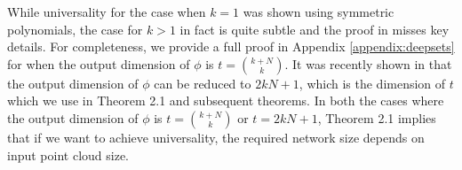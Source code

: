 \documentclass[12pt]{article}
\newcommand{\samedit}[1]{{{\textcolor{darkblue}{#1}}}}
\begin{document}
While universality for the case when $k = 1$ was shown using symmetric polynomials, the case for $k > 1$ in fact is quite subtle and the proof in \citep{zaheer2017deep} misses key details. For completeness, we provide a full proof in Appendix \ref{appendix:deepsets} for when the output dimension of $\phi$ is $t = \binom{k + N}{k}$. It was recently shown in \citep{dym2022low, amir2023neural} that the output dimension of $\phi$ can be reduced to $2kN + 1$, which is the dimension of $t$ which we use in Theorem 2.1 and subsequent theorems. In both the cases where the output dimension of $\phi$ is $t = \binom{k + N}{k}$ or $t = 2kN + 1$, Theorem 2.1 implies that if we want to achieve universality, the required network size depends on input point cloud size.
\end{document}
